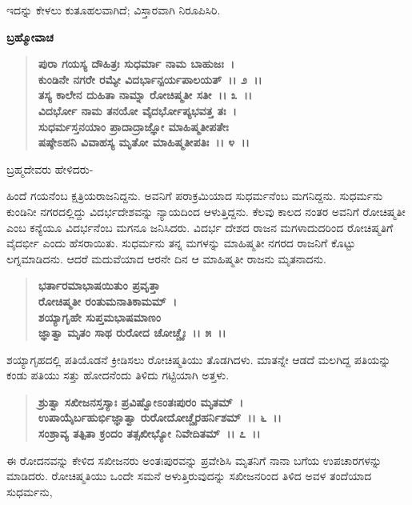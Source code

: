 ಇದನ್ನು ಕೇಳಲು ಕುತೂಹಲವಾಗಿದೆ; ವಿಸ್ತಾರವಾಗಿ ನಿರೂಪಿಸಿರಿ.

\begin{flushleft}
\textbf{ಬ್ರಹ್ಮೋವಾಚ\enginline{-}}
\end{flushleft}

\begin{verse}
\textbf{ಪುರಾ ಗಯಸ್ಯ ದೌಹಿತ್ರಃ ಸುಧರ್ಮಾ ನಾಮ ಬಾಹುಜಃ~।}\\\textbf{ಕುಂಡಿನೇ ನಗರೇ ರಮ್ಯೇ ವಿದರ್ಭಾನ್ಪರ್ಯಪಾಲಯತ್~।। ೨~।। }\\\textbf{ತಸ್ಯ ಕಾಲೇನ ದುಹಿತಾ ನಾಮ್ನಾ ರೋಚಿಷ್ಮತೀ ಸತೀ~।। ೩~।।} \\\textbf{ವಿದರ್ಭೋ ನಾಮ ತನಯೋ ವೈದರ್ಭೋಪ್ಯಭವತ್ತ ತಃ~।} \\\textbf{ಸುಧರ್ಮಸ್ತನಯಾಂ ಪ್ರಾದಾದ್ರಾಜ್ಞೋ ಮಾಹಿಷ್ಮತೀಪತೇಃ} \\\textbf{ಷಷ್ಠೇಽಹನಿ ವಿವಾಹಸ್ಯ ಮೃತೋ ಮಾಹಿಷ್ಮತೀಪತಿಃ~।। ೪~।।}
\end{verse}

\begin{flushleft}
ಬ್ರಹ್ಮದೇವರು ಹೇಳಿದರು-
\end{flushleft}

ಹಿಂದೆ ಗಯನೆಂಬ ಕ್ಷತ್ರಿಯರಾಜನಿದ್ದನು. ಅವನಿಗೆ ಪರಾಕ್ರಮಿಯಾದ ಸುಧರ್ಮನೆಂಬ ಮಗನಿದ್ದನು. ಸುಧರ್ಮನು ಕುಂಡಿನೀ ನಗರದಲ್ಲಿದ್ದು ವಿದರ್ಭದೇಶವನ್ನು ನ್ಯಾಯದಿಂದ ಆಳುತ್ತಿದ್ದನು. ಕೆಲವು ಕಾಲದ ನಂತರ ಅವನಿಗೆ ರೋಚಿಷ್ಮತೀ ಎಂಬ ಕನ್ಯೆಯೂ ವಿದರ್ಭನೆಂಬ ಮಗನೂ ಜನಿಸಿದರು. ವಿದರ್ಭ ದೇಶದ ರಾಜನ ಮಗಳಾದುದರಿಂದ ರೋಚಿಷ್ಮತಿಗೆ ವೈದರ್ಭೀ ಎಂದು ಹೆಸರಾಯಿತು. ಸುಧರ್ಮನು ತನ್ನ ಮಗಳನ್ನು ಮಾಹಿಷ್ಮತೀ ನಗರದ ರಾಜನಿಗೆ ಕೊಟ್ಟು ಲಗ್ನಮಾಡಿದನು. ಆದರೆ ಮದುವೆಯಾದ ಆರನೇ ದಿನ ಆ ಮಾಹಿಷ್ಮತೀ ರಾಜನು ಮೃತನಾದನು.

\begin{verse}
\textbf{ಭರ್ತಾರಮಾಭಾಷಯಿತುಂ ಪ್ರವೃತ್ತಾ} \\\textbf{ರೋಚಿಷ್ಮತೀ ರಂತುಮನಾತಿಕಾಮಮ್~।}\\\textbf{ಶಯ್ಯಾಗೃಹೇ ಸುಪ್ತಮಭಾಷಮಾಣಂ }\\\textbf{ಜ್ಞಾತ್ವಾ ಮೃತಂ ಸಾಥ ರುರೋದ ಚೋಚ್ಚೈಃ~।। ೫~।।}
\end{verse}

ಶಯ್ಯಾಗೃಹದಲ್ಲಿ ಪತಿಯೊಡನೆ ಕ್ರೀಡಿಸಲು ರೋಚಿಷ್ಮತಿಯು ತೊಡಗಿದಳು. ಮಾತನ್ನೇ ಆಡದೆ ಮಲಗಿದ್ದ ಪತಿಯನ್ನು ಕಂಡು ಪತಿಯು ಸತ್ತು ಹೋದನೆಂದು ತಿಳಿದು ಗಟ್ಟಿಯಾಗಿ ಅತ್ತಳು.

\begin{verse}
\textbf{ಶ್ರುತ್ವಾ ಸಖೀಜನಸ್ತಸ್ಯಾಃ ಪ್ರವಿಷ್ವೋಽಂತಃಪುರಂ ಮೃತಮ್~।}\\\textbf{ಉಪಾಯೈರ್ಬಹುರ್ಭಿಜ್ಞಾತ್ವಾ ರುರೋದೋಚ್ಚೈರಹರ್ನಿಶಮ್~।। ೬~।।}\\\textbf{ಸಂಶ್ರಾವ್ಯ ತತ್ಪಿತಾ ಕ್ರಂದಂ ತತ್ಸಖೀಭ್ಯೋ ನಿವೇದಿತಮ್~।। ೭~।।}
\end{verse}

ಈ ರೋದನವನ್ನು ಕೇಳಿದ ಸಖೀಜನರು ಅಂತಃಪುರವನ್ನು ಪ್ರವೇಶಿಸಿ ಮೃತನಿಗೆ ನಾನಾ ಬಗೆಯ ಉಪಚಾರಗಳನ್ನು ಮಾಡಿದರು. ರೋಚಿಷ್ಮತಿಯು ಒಂದೇ ಸಮನೆ ಅಳುತ್ತಿರುವುದನ್ನು ಸಖೀಜನರಿಂದ ತಿಳಿದ ಅವಳ ತಂದೆಯಾದ ಸುಧರ್ಮನು,

